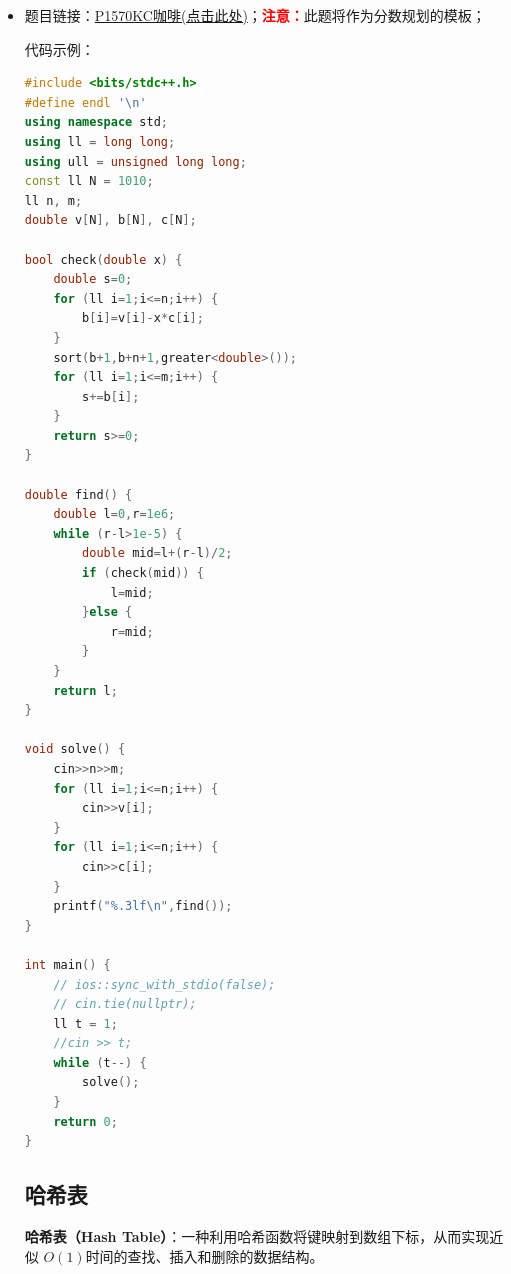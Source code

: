 \begin{itemize}
\begin{lstlisting}[language=C++]
auto solve() -> void {
	cin >> n >> m >> w;
	ll mmax = -1e18, mmin = 1e18;
	for (ll i = 0; i < n; i++) {
		cin >> v[i];
		mmax = max(mmax, v[i]);
		mmin = min(mmin, v[i]);
	}
	ll left = mmin - 1, right = mmax + m;
	while (left + 1 < right) {
		ll mid = left + ((right - left) >> 1);
		if (check(mid)) {
			left = mid;
		} else {
			right = mid;
		}
	}
	cout << left << endl;
}
\end{lstlisting}
\subsection{分数规划}
\textbf{分数规划（Fractional Programming）}指的是求解形如
\[
\max_{x \in S} \; \frac{f(x)}{g(x)},
\]
的优化问题，其中 $f(x)$ 和 $g(x)$ 为实函数且满足 $g(x) > 0$。其核心思想是将分式目标转换为等价的参数化形式，例如通过 Dinkelbach 方法，将其转化为一系列
\[
\max_{x \in S} \; f(x) - \lambda g(x)
\]
的子问题来求解。
\subsubsection{P1570KC咖啡}
\item 题目链接：\href{https://www.luogu.com.cn/problem/P1570}{P1570KC咖啡(点击此处)}；\textcolor{red}{\textbf{注意：}}此题将作为分数规划的模板；
	
代码示例：\\
\begin{lstlisting}[language=C++]
#include <bits/stdc++.h>
#define endl '\n'
using namespace std;
using ll = long long;
using ull = unsigned long long;
const ll N = 1010;
ll n, m;
double v[N], b[N], c[N];

bool check(double x) {
	double s=0;
	for (ll i=1;i<=n;i++) {
		b[i]=v[i]-x*c[i];
	}
	sort(b+1,b+n+1,greater<double>());
	for (ll i=1;i<=m;i++) {
		s+=b[i];
	}
	return s>=0;
}

double find() {
	double l=0,r=1e6;
	while (r-l>1e-5) {
		double mid=l+(r-l)/2;
		if (check(mid)) {
			l=mid;
		}else {
			r=mid;
		}
	}
	return l;
}

void solve() {
	cin>>n>>m;
	for (ll i=1;i<=n;i++) {
		cin>>v[i];
	}
	for (ll i=1;i<=n;i++) {
		cin>>c[i];
	}
	printf("%.3lf\n",find());
}

int main() {
	// ios::sync_with_stdio(false);
	// cin.tie(nullptr);
	ll t = 1;
	//cin >> t;
	while (t--) {
		solve();
	}
	return 0;
}
\end{lstlisting}
\subsection{哈希表}
\textbf{哈希表（Hash Table）}：一种利用哈希函数将键映射到数组下标，从而实现近似 $O(1)$时间的查找、插入和删除的数据结构。


\end{itemize}
